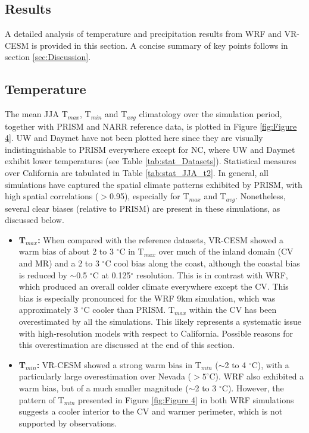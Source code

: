 \documentclass[draft,ms]{agutex}   %
\begin{document}
\begin{article}
\section{Results}

A detailed analysis of temperature and precipitation results from WRF and VR-CESM is provided in this section.  A concise summary of key points follows in section \ref{sec:Discussion}.

\subsection{Temperature}

The mean JJA T$_{max}$, T$_{min}$ and T$_{avg}$ climatology over the simulation period, together with PRISM and NARR reference data, is plotted in Figure \ref{fig:Figure 4}. UW and Daymet have not been plotted here since they are visually indistinguishable to PRISM everywhere except for NC, where UW and Daymet exhibit lower temperatures (see Table \ref{tab:stat_Datasets}).  Statistical measures over California are tabulated in Table \ref{tab:stat_JJA_t2}. In general, all simulations have captured the spatial climate patterns exhibited by PRISM, with high spatial correlations ($>$0.95), especially for T$_{max}$ and T$_{avg}$.  Nonetheless, several clear biases (relative to PRISM) are present in these simulations, as discussed below.

\begin{itemize}
\item{} \textbf{T$_{max}$:}  When compared with the reference datasets, VR-CESM showed a warm bias of about 2 to 3 $^\circ$C in T$_{max}$ over much of the inland domain (CV and MR) and a 2 to 3 $^\circ$C cool bias along the coast, although the coastal bias is reduced by $\sim$0.5 $^\circ$C at 0.125$^\circ$ resolution. This is in contrast with WRF, which produced an overall colder climate everywhere except the CV.  This bias is especially pronounced for the WRF 9km simulation, which was approximately 3 $^\circ$C cooler than PRISM. T$_{max}$ within the CV has been overestimated by all the simulations. This likely represents a systematic issue with high-resolution models with respect to California.  Possible reasons for this overestimation are discussed at the end of this section.


\item{} \textbf{T$_{min}$:}  VR-CESM showed a strong warm bias in T$_{min}$ ($\sim$2 to 4 $^\circ$C), with a particularly large overestimation over Nevada ($> 5 ^\circ$C). WRF also exhibited a warm bias, but of a much smaller magnitude ($\sim$2 to 3 $^\circ$C). However, the pattern of T$_{min}$ presented in Figure \ref{fig:Figure 4} in both WRF simulations suggests a cooler interior to the CV and warmer perimeter, which is not supported by observations.


\end{itemize}
\end{article}
\end{document}
